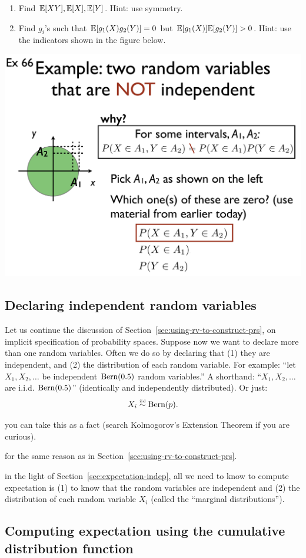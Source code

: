 \documentclass{article}
\begin{document}
\begin{enumerate}
  \item Find ${\mathbb E}[XY], {\mathbb E}[X], {\mathbb E}[Y]$. Hint: use symmetry.
  \item Find $g_i$'s such that ${\mathbb E}[g_1(X) g_2(Y)] = 0$ but ${\mathbb E}[g_1(X)] {\mathbb E}[g_2(Y)] > 0$. Hint: use the indicators shown in the figure below.
\end{enumerate}
\begin{center}
	\includegraphics[width=0.2\linewidth]{figures/circle-indicators}
\end{center}


\subsection{Declaring independent random variables}

Let us continue the discussion of Section~\ref{sec:using-rv-to-construct-prs}, on implicit specification of probability spaces. Suppose now we want to declare more than one random variables. Often we do so by declaring that (1) they are independent, and (2) the distribution of each random variable. For example: ``let $X_1, X_2, \dots$ be independent $\operatorname{Bern}(0.5)$ random variables.'' A shorthand: ``$X_1, X_2, \dots$ are i.i.d. $\operatorname{Bern}(0.5)$'' (identically and independently distributed). Or just:
\[ X_i \stackrel{\scriptscriptstyle \textrm{iid}}{\sim} \operatorname{Bern}(p). \]

 you can take this as a fact (search Kolmogorov's Extension Theorem if you are curious). 

 for the same reason as in Section~\ref{sec:using-rv-to-construct-prs}.

 in the light of Section~\ref{sec:expectation-indep}, all we need to know to compute expectation is (1) to know that the random variables are independent and (2) the distribution of each random variable $X_i$ (called the ``marginal distributions'').


\subsection{Computing expectation using the cumulative distribution function}
\end{document}
